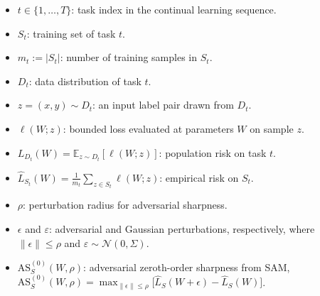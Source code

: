 \documentclass{article}
\theoremstyle{plain}
\theoremstyle{definition}
\theoremstyle{remark}
\begin{document}
\begin{itemize}
\item $t\in\{1,\dots,T\}$: task index in the continual learning sequence. %
\item $S_t$: training set of task $t$.
\item $m_t := |S_t|$: number of training samples in $S_t$.
\item $D_t$: data distribution of task $t$.
\item $z=(x,y)\sim D_t$: an input label pair drawn from $D_t$.
\item $\ell(W;z)$: bounded loss evaluated at parameters $W$ on sample $z$.
\item $L_{D_t}(W)=\mathbb E_{z\sim D_t}[\ell(W;z)]$: population risk on task $t$. 
\item $\widehat L_{S_t}(W)=\frac{1}{m_t}\sum_{z\in S_t}\ell(W;z)$: empirical risk on $S_t$.




\item $\rho$: perturbation radius for adversarial sharpness.

\item $\epsilon$ and $\varepsilon$: adversarial and Gaussian perturbations, respectively, where $\|\epsilon\|\le \rho$ and $\varepsilon\sim\mathcal N(0,\Sigma)$.

\item $\mathrm{AS}^{(0)}_S(W,\rho)$: adversarial zeroth-order sharpness from SAM,
$\mathrm{AS}^{(0)}_S(W,\rho)=\max_{\|\epsilon\|\le\rho}\big[\widehat L_S(W+\epsilon)-\widehat L_S(W)\big]$.


\end{itemize}
\end{document}
